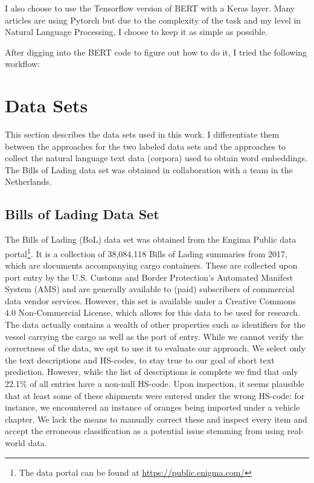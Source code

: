 I also choose to use the Tensorflow version of BERT with a Keras layer. Many articles are using Pytorch but due to the complexity of the task and my level in Natural Language Processing, I choose to keep it as simple as possible. 

After digging into the BERT code to figure out how to do it, I tried the following workflow:


\section{Data Sets}
This section describes the data sets used in this work. I differentiate them between the approaches for the two labeled data sets and the approaches to collect the natural language text data (corpora) used to obtain word embeddings.
The Bills of Lading data set was obtained in collaboration with a team in the Netherlands.

\subsection{Bills of Lading Data Set}
The Bills of Lading (BoL) data set was obtained from the Engima Public data portal\footnote{The data portal can be found at \url{https://public.enigma.com/}}. It is a collection of 38,084,118 Bills of Lading summaries from 2017, which are documents accompanying cargo containers. These are collected upon port entry by the U.S. Customs and Border Protection’s Automated Manifest System (AMS) and are generally available to (paid) subscribers of commercial data vendor services. However, this set is available under a Creative Commons 4.0 Non-Commercial License, which allows for this data to be used for research. The data actually contains a wealth of other properties such as identifiers for the vessel carrying the cargo as well as the port of entry. While we cannot verify the correctness of the data, we opt to use it to evaluate our approach. We select only the text descriptions and HS-codes, to stay true to our goal of short text prediction. However, while the list of descriptions is complete we find that only 22.1{\%} of all entries have a non-null HS-code. Upon inspection, it seems plausible that at least some of these shipments were entered under the wrong HS-code: for instance, we encountered an instance of oranges being imported under a vehicle chapter. We lack the means to manually correct these and inspect every item and accept the erroneous classification as a potential issue stemming from using real-world data. \\

